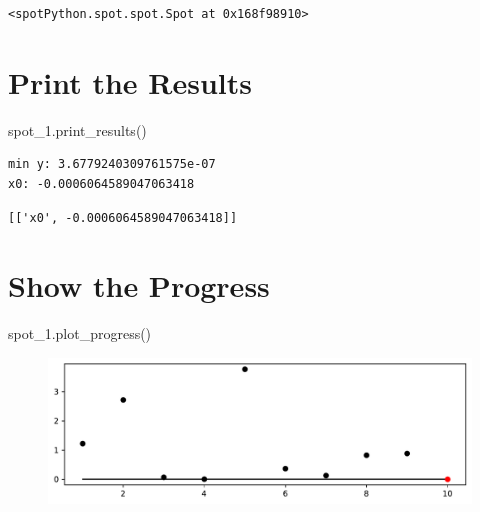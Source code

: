 \documentclass[
  letterpaper,
  DIV=11,
  numbers=noendperiod]{scrreprt}
\newenvironment{Shaded}{\begin{snugshade}}{\end{snugshade}}
\newcommand{\NormalTok}[1]{\textcolor[rgb]{0.00,0.23,0.31}{#1}}
\begin{document}
\begin{verbatim}
<spotPython.spot.spot.Spot at 0x168f98910>
\end{verbatim}

\hypertarget{print-the-results}{%
\section{Print the Results}\label{print-the-results}}

\begin{Shaded}
\begin{Highlighting}[]
\NormalTok{spot\_1.print\_results()}
\end{Highlighting}
\end{Shaded}

\begin{verbatim}
min y: 3.6779240309761575e-07
x0: -0.0006064589047063418
\end{verbatim}

\begin{verbatim}
[['x0', -0.0006064589047063418]]
\end{verbatim}

\hypertarget{show-the-progress}{%
\section{Show the Progress}\label{show-the-progress}}

\begin{Shaded}
\begin{Highlighting}[]
\NormalTok{spot\_1.plot\_progress()}
\end{Highlighting}
\end{Shaded}

\begin{figure}[H]

{\centering \includegraphics{01_spot_intro_files/figure-pdf/cell-12-output-1.pdf}

}

\end{figure}
\end{document}
